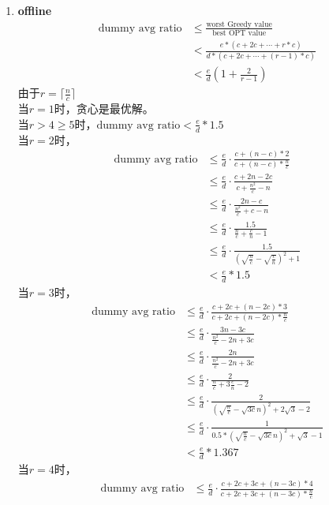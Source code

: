 \documentclass[UTF8]{ctexart}
\newcommand{\Emph}{\textbf}
\begin{document}
\begin{enumerate}[(1)]
	\newpage
	\item \Emph{offline}
	\begin{align*}
		\text{dummy avg ratio} &\le \frac{\text{worst Greedy value}}{\text{best OPT value}} \\
						   &< \frac{e * (c+2c+\cdots+r*c)}{d * (c+2c+\cdots+(r-1)*c)} \\
						   &< \frac{e}{d} (1 + \frac{2}{r-1})
	\end{align*}
	由于$r = \lceil \frac{n}{c}    \rceil$ \\
	当$r = 1$时，贪心是最优解。				\\
	当$r > 4 \ge 5$时，$\text{dummy avg ratio} < \frac{e}{d} * 1.5$ \\
	当$r = 2$时，\\
	\begin{align*}
		\text{dummy avg ratio} &\le \frac{e}{d} \cdot \frac{c + (n-c)*2}{c + (n-c)*\frac{n}{c}} \\
								&\le \frac{e}{d} \cdot \frac{c + 2n - 2c}{c+\frac{n^2}{c} - n} \\
								&\le \frac{e}{d} \cdot \frac{2n-c}{\frac{n^2}{c}+c-n} \\
								&\le \frac{e}{d} \cdot \frac{1.5}{\frac{n}{c}+\frac{c}{n}-1} \\
								&\le \frac{e}{d} \cdot \frac{1.5}{(\sqrt{\frac{n}{c}} - \sqrt{\frac{c}{n}})^2+1} \\
								&<   \frac{e}{d} * 1.5
	\end{align*}
	当$r = 3$时，\\
	\begin{align*}
		\text{dummy avg ratio} &\le \frac{e}{d} \cdot \frac{c + 2c + (n-2c)*3}{c + 2c + (n-2c)*\frac{n}{c}} \\
								&\le \frac{e}{d} \cdot \frac{3n-3c}{\frac{n^2}{c}-2n+3c} \\
								&\le \frac{e}{d} \cdot \frac{2n}{\frac{n^2}{c}-2n+3c} \\
								&\le \frac{e}{d} \cdot \frac{2}{\frac{n}{c}+3\frac{c}{n}-2} \\
								&\le \frac{e}{d} \cdot \frac{2}{(\sqrt{\frac{n}{c}} - \sqrt{3c}{n})^2+2\sqrt{3}-2} \\
								&\le \frac{e}{d} \cdot \frac{1}{0.5 * (\sqrt{\frac{n}{c}} - \sqrt{3c}{n})^2 + \sqrt{3} - 1} \\
								&< \frac{e}{d} * 1.367
	\end{align*}
	当$r = 4$时，\\
	\begin{align*}
		\text{dummy avg ratio} &\le \frac{e}{d} \cdot \frac{c + 2c + 3c + (n-3c)*4}{c + 2c + 3c + (n-3c)*\frac{n}{c}} \\

\end{align*}
\end{enumerate}
\end{document}
